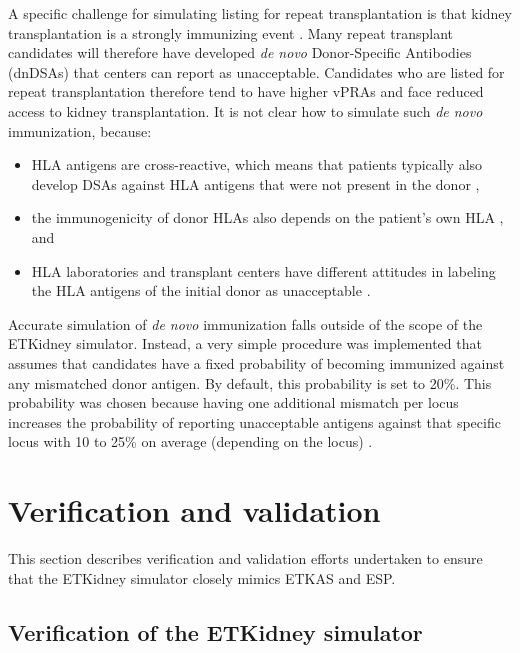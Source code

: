 \documentclass[11pt,twoside,]{book}
\begin{document}
A specific challenge for simulating listing for repeat transplantation is that
kidney transplantation is a strongly immunizing event \citep{Lopes2015}. Many
repeat transplant candidates will therefore have
developed \emph{de novo} Donor-Specific Antibodies (dnDSAs) that centers can report as
unacceptable. Candidates who are listed for repeat transplantation
therefore tend to have higher vPRAs and face reduced access to kidney transplantation.
\newpage
It is not clear how to simulate such \emph{de novo} immunization, because:

\begin{itemize}
\item
  HLA antigens are cross-reactive, which means that patients typically also
  develop DSAs against HLA antigens that were not present in the donor \citep{Lucas2015},
\item
  the immunogenicity of donor HLAs also depends on the patient's own HLA
  \citep{Lucas2015}, and
\item
  HLA laboratories and transplant centers have different attitudes in
  labeling the HLA antigens of the initial donor as unacceptable \citep{Susal2013, Ziemann2022}.
\end{itemize}

Accurate simulation of \emph{de novo} immunization falls outside of the scope of
the ETKidney simulator. Instead, a very simple procedure was
implemented that assumes that candidates have a fixed probability
of becoming immunized against any mismatched donor antigen. By default,
this probability is set to 20\%. This probability was chosen because
having one additional mismatch per locus increases the probability of
reporting unacceptable antigens against that specific locus with 10 to 25\%
on average (depending on the locus) \citep{Isaacson2022}.

\section{Verification and validation}\label{sec:etkidneyvv}

This section describes verification and validation efforts undertaken to
ensure that the ETKidney simulator closely mimics ETKAS and ESP.

\subsection{Verification of the ETKidney simulator}\label{sec:etkidneyverification}
\end{document}

